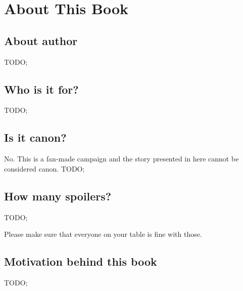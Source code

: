 \section{About This Book}

\subsection{About author}

TODO; \lipsum[1]

\subsection{Who is it for?}

TODO; \lipsum[1][1-5]

\subsection{Is it canon?}

No. This is a fan-made campaign and the story presented in here cannot be considered canon. TODO; \lipsum[1][1]

\subsection{How many spoilers?}

TODO; \lipsum[1][1-5]

Please make sure that everyone on your table is fine with those.

\subsection{Motivation behind this book}

TODO; \lipsum[2]